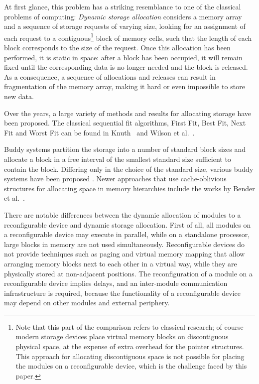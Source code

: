 \documentclass{article}
\begin{document}
At first glance, this problem has a striking resemblance to
one of the classical problems of computing:
{\em Dynamic storage allocation} considers
a memory array and a sequence of storage requests of varying
size, looking for an assignment of each request to a 
contiguous\footnote{Note that this part of the comparison 
refers to classical research;
of course modern storage devices place
virtual memory blocks on discontiguous physical space, at the 
expense of extra overhead for the pointer structures. This
approach for allocating discontiguous
space is not possible for placing the modules on a reconfigurable 
device, which is the challenge faced by this paper.}
block of memory cells, such
that the length of each block corresponds to the size of the request.
Once this allocation has been performed,
it is static in space: after a block has been occupied,
it will remain fixed until the corresponding data is no longer needed
and the block is released. As a consequence, a sequence of
allocations and releases can result in fragmentation of
the memory array, making it hard or even impossible to store
new data.

Over the years, a large variety of methods and results for
allocating storage have been proposed. The classical sequential fit
algorithms, First Fit, Best Fit, Next Fit and Worst Fit can be found
in Knuth~\cite{Knuth97} and Wilson et al.~\cite{Wils95}.

Buddy systems partition the storage into a number of standard block
sizes and allocate a block in a free interval of the smallest
standard size sufficient to contain the block. Differing only in the
choice of the standard size, various buddy systems have been 
proposed
\cite{Bromley80,Hinds75,Hirs73,Know65,Shen74,Knuth97}.
Newer approaches that use cache-oblivious structures
for allocating space in memory hierarchies
include the works by Bender et al.~\cite{Bender05,Bender05a}.

There are notable differences between the dynamic allocation of
modules to a reconfigurable device and dynamic storage
allocation. First of all, all modules on a reconfigurable device may execute
in parallel, while on a standalone processor, large blocks in memory
are not used simultaneously. Reconfigurable devices do not provide 
techniques such as
paging and virtual memory mapping that allow arranging memory blocks
next to each other in a virtual way, while they are physically stored 
at non-adjacent
positions. The reconfiguration of a module on a reconfigurable device
implies delays, and an inter-module communication infrastructure is
required, because the functionality of a reconfigurable device may depend on
other modules and external periphery.
\end{document}
